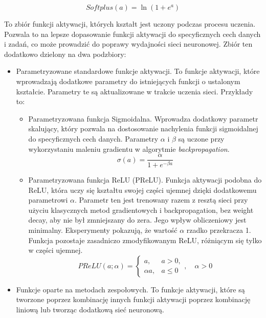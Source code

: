 \begin{description}
\begin{itemize}
\begin{itemize}
                    \[Softplus(a) = \ln(1 + e^{a})\]
                \end{itemize}
        \end{itemize}
    \item [Funkcje aktywacji o zmiennym kształcie (ang \textit{Trainable shape}).] To zbiór funkcji aktywacji, których kształt jest uczony podczas procesu uczenia. Pozwala to na lepsze dopasowanie funkcji aktywacji do specyficznych cech danych i zadań, co może prowadzić do poprawy wydajności sieci neuronowej. Zbiór ten dodatkowo dzielony na dwa podzbiory:
        \begin{itemize}
            \item Parametryzowane standardowe funkcje aktywacji. To funkcje aktywacji, które wprowadzają dodatkowe parametry do istniejących funkcji o ustalonym kształcie. Parametry te są aktualizowane w trakcie uczenia sieci. Przykłady to:
                \begin{itemize}

                    \item Parametryzowana funkcja Sigmoidalna. Wprowadza dodatkowy parametr skalujący, który pozwala na dostosowanie nachylenia funkcji sigmoidalnej do specyficznych cech danych. Parametry $\alpha$ i $\beta$ są uczone przy wykorzystaniu maleniu gradientu w algorytmie \textit{backpropagation}.
                    \[\sigma(a) = \frac{\alpha}{1 + e^{-\beta a}}\]

                    \item Parametryzowana funkcja ReLU (PReLU). Funkcja aktywacji podobna do ReLU, która uczy się kształtu swojej części ujemnej dzięki dodatkowemu parametrowi $\alpha$. Parametr ten jest trenowany razem z resztą sieci przy użyciu klasycznych metod gradientowych i backpropagation, bez weight decay, aby nie był zmniejszany do zera. Jego wpływ obliczeniowy jest minimalny. Eksperymenty pokazują, że wartość $\alpha$ rzadko przekracza 1. Funkcja pozostaje zasadniczo zmodyfikowanym ReLU, różniącym się tylko w części ujemnej.
                    \[PReLU(a; \alpha) = \begin{cases}
                                            a, & a > 0, \\
                                            \alpha a, & a \leq 0
                                        \end{cases}, \quad \alpha > 0\]
                \end{itemize}
            \item Funkcje oparte na metodach zespołowych. To funkcje aktywacji, które są tworzone poprzez kombinację innych funkcji aktywacji poprzez kombinację liniową lub tworząc dodatkową sieć neuronową. 
        \end{itemize}
\end{description}

